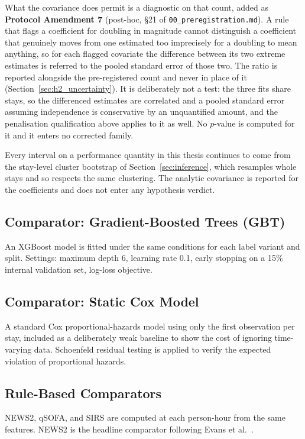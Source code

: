 What the covariance does permit is a diagnostic on that count, added as
\textbf{Protocol Amendment 7} (post-hoc, \S21 of
\texttt{00\_preregistration.md}). A rule that flags a coefficient for doubling
in magnitude cannot distinguish a coefficient that genuinely moves from one
estimated too imprecisely for a doubling to mean anything, so for each flagged
covariate the difference between its two extreme estimates is referred to the
pooled standard error of those two. The ratio is reported alongside the
pre-registered count and never in place of it
(Section~\ref{sec:h2_uncertainty}). It is deliberately not a test: the three
fits share stays, so the differenced estimates are correlated and a pooled
standard error assuming independence is conservative by an unquantified amount,
and the penalisation qualification above applies to it as well. No $p$-value is
computed for it and it enters no corrected family.

Every interval on a performance quantity in this thesis continues to come from
the stay-level cluster bootstrap of Section~\ref{sec:inference}, which
resamples whole stays and so respects the same clustering. The analytic
covariance is reported for the coefficients and does not enter any hypothesis
verdict.

\subsection{Comparator: Gradient-Boosted Trees (GBT)}

An XGBoost model is fitted under the same conditions for each label variant
and split. Settings: maximum depth 6, learning rate 0.1, early stopping on a
15\% internal validation set, log-loss objective.

\subsection{Comparator: Static Cox Model}

A standard Cox proportional-hazards model using only the first observation per
stay, included as a deliberately weak baseline to show the cost of ignoring
time-varying data. Schoenfeld residual testing is applied to verify the expected
violation of proportional hazards.

\subsection{Rule-Based Comparators}

NEWS2, qSOFA, and SIRS are computed at each person-hour from the same features.
NEWS2 is the headline comparator following Evans et al.\
\cite{evans2021ssc}.


